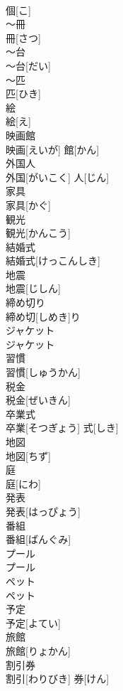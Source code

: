 \documentclass[8pt]{extreport}
\begin{document}
\begin{CJK}{UTF8}{min}
\\	個[こ]
\\	～冊	
\\	冊[さつ]
\\	～台	
\\	～台[だい]
\\	～匹	
\\	匹[ひき]
\\	絵	
\\	絵[え]
\\	映画館	
\\	映画[えいが] 館[かん]
\\	外国人	
\\	外国[がいこく] 人[じん]
\\	家具	
\\	家具[かぐ]
\\	観光	
\\	観光[かんこう]
\\	結婚式	
\\	結婚式[けっこんしき]
\\	地震	
\\	地震[じしん]
\\	締め切り	
\\	締め切[しめき]り
\\	ジャケット	
\\	ジャケット
\\	習慣	
\\	習慣[しゅうかん]
\\	税金	
\\	税金[ぜいきん]
\\	卒業式	
\\	卒業[そつぎょう] 式[しき]
\\	地図	
\\	地図[ちず]
\\	庭	
\\	庭[にわ]
\\	発表	
\\	発表[はっぴょう]
\\	番組	
\\	番組[ばんぐみ]
\\	プール	
\\	プール
\\	ペット	
\\	ペット
\\	予定	
\\	予定[よてい]
\\	旅館	
\\	旅館[りょかん]
\\	割引券	
\\	割引[わりびき] 券[けん]

\end{CJK}
\end{document}
